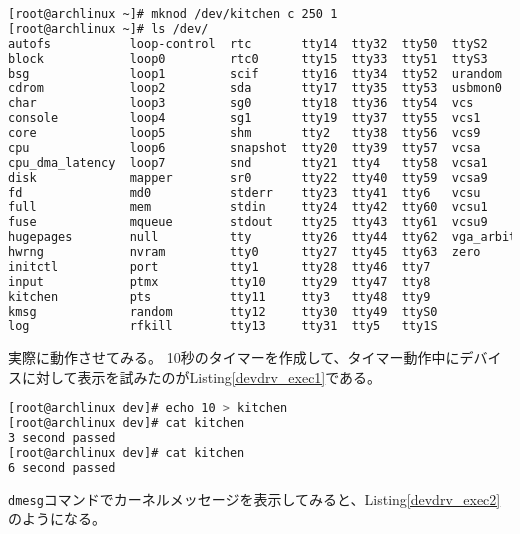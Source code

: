 \documentclass[main]{subfiles}
\begin{document}
\begin{lstlisting}[label=device_register,caption=\texttt{/dev}以下にファイルを作成,language=sh]
[root@archlinux ~]# mknod /dev/kitchen c 250 1
[root@archlinux ~]# ls /dev/
autofs           loop-control  rtc       tty14  tty32  tty50  ttyS2
block            loop0         rtc0      tty15  tty33  tty51  ttyS3
bsg              loop1         scif      tty16  tty34  tty52  urandom
cdrom            loop2         sda       tty17  tty35  tty53  usbmon0
char             loop3         sg0       tty18  tty36  tty54  vcs
console          loop4         sg1       tty19  tty37  tty55  vcs1
core             loop5         shm       tty2   tty38  tty56  vcs9
cpu              loop6         snapshot  tty20  tty39  tty57  vcsa
cpu_dma_latency  loop7         snd       tty21  tty4   tty58  vcsa1
disk             mapper        sr0       tty22  tty40  tty59  vcsa9
fd               md0           stderr    tty23  tty41  tty6   vcsu
full             mem           stdin     tty24  tty42  tty60  vcsu1
fuse             mqueue        stdout    tty25  tty43  tty61  vcsu9
hugepages        null          tty       tty26  tty44  tty62  vga_arbiter
hwrng            nvram         tty0      tty27  tty45  tty63  zero
initctl          port          tty1      tty28  tty46  tty7
input            ptmx          tty10     tty29  tty47  tty8
kitchen          pts           tty11     tty3   tty48  tty9
kmsg             random        tty12     tty30  tty49  ttyS0
log              rfkill        tty13     tty31  tty5   tty1S
\end{lstlisting}

実際に動作させてみる。
10秒のタイマーを作成して、タイマー動作中にデバイスに対して表示を試みたのがListing\ref{devdrv_exec1}である。

\begin{lstlisting}[label=devdrv_exec1,caption=シェル上での動作,language=sh]
[root@archlinux dev]# echo 10 > kitchen
[root@archlinux dev]# cat kitchen
3 second passed
[root@archlinux dev]# cat kitchen
6 second passed
\end{lstlisting}

\texttt{dmesg}コマンドでカーネルメッセージを表示してみると、Listing\ref{devdrv_exec2}のようになる。
\end{document}
